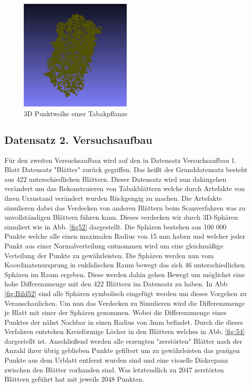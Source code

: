 \documentclass{llncs}
\begin{document}
\begin{figure}[htbp] 
	\centering
	\includegraphics[width=0.5\textwidth]{leaf1.png}
	\caption{3D Punktwolke einer Tabakpflanze}
	\label{fig:Bild51}
\end{figure}
\newpage
\subsection{Datensatz 2. Versuchsaufbau}\label{sec:versuch2_daten}

Für den zweiten Versuchsaufbau wird auf den in Datensatz Versuchsaufbau 1. Blatt Datensatz "Blätter" zurück gegriffen. Das heißt der Grunddatensatz besteht aus 422 unterschiedlichen Blättern. Dieser Datensatz wird nun dahingehen verändert um das Rekonstruieren von Tabakblättern welche durch Artefakte von ihren Urzustand verändert wurden Rückgengig zu machen. Die Artefakte simulieren dabei das Verdecken von anderen Blättern beim Scanverfahren was zu unvollständigen Blättern führen kann. Dieses verdecken wir durch 3D-Sphären simuliert wie in Abb. \ref{fig52} dargestellt. Die Sphären bestehen aus 100 000 Punkte welche alle einen maximalen Radius von 15 mm haben und welcher jeder Punkt aus einer Normalverteilung entnommen wird um  eine gleichmäßige Verteilung der Punkte zu gewährleisten. Die Sphären werden nun vom Koordinatenursprung in euklidischen Raum bewegt das sich 46 unterschiedlichen Sphären im Raum ergeben. Diese werden dahin gehen Bewegt um möglichst eine hohe Differenzmenge mit den 422 Blättern im Datensatz zu haben. In Abb  \ref{fig:Bild52} sind alle Sphären symbolisch eingefügt werden um dieses Vorgehen zu Veranschaulichen. Um nun das Verdecken zu Simulieren wird die Differenzmenge je Blatt mit einer der Sphären genommen. Wobei die Differenzmenge eines Punktes der nähst Nachbar in einen Radius von 3mm befindet. Durch die dieses Verfahren entstehen Kreisförmige Löcher in den Blättern welches in Abb. \ref{fig:54} dargestellt ist. Anschließend werden alle erzeugten "zerstörten" Blätter nach der Anzahl ihrer übrig geblieben Punkte gefiltert um zu gewährleisten das genügen Punkte aus dem Urblatt entfernt wurden sind und eine visuelle Diskrepanz zwischen den Blätter vorhanden sind. Was letztendlich zu 2047 zerstörten Blättern geführt hat mit jeweils  2048 Punkten.
\end{document}
